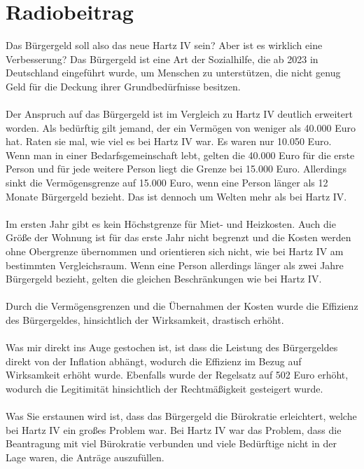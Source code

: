 \documentclass[11pt,a4paper]{article}
\begin{document}
    \section{Radiobeitrag}

    Das Bürgergeld soll also das neue Hartz IV sein?
    Aber ist es wirklich eine Verbesserung?
    Das Bürgergeld ist eine Art der Sozialhilfe, die ab 2023 in Deutschland eingeführt wurde, um Menschen zu unterstützen, die nicht genug Geld für die Deckung ihrer Grundbedürfnisse besitzen.
    \\\\
    Der Anspruch auf das Bürgergeld ist im Vergleich zu Hartz IV deutlich erweitert worden.
    Als bedürftig gilt jemand, der ein Vermögen von weniger als 40.000 Euro hat.
    Raten sie mal, wie viel es bei Hartz IV war.
    Es waren nur 10.050 Euro.
    Wenn man in einer Bedarfsgemeinschaft lebt, gelten die 40.000 Euro für die erste Person und für jede weitere Person liegt die Grenze bei 15.000 Euro.
    Allerdings sinkt die Vermögensgrenze auf 15.000 Euro, wenn eine Person länger als 12 Monate Bürgergeld bezieht.
    Das ist dennoch um Welten mehr als bei Hartz IV.
    \\\\
    Im ersten Jahr gibt es kein Höchstgrenze für Miet- und Heizkosten.
    Auch die Größe der Wohnung ist für das erste Jahr nicht begrenzt und die Kosten werden ohne Obergrenze übernommen und orientieren sich nicht, wie bei Hartz IV am bestimmten Vergleichsraum.
    Wenn eine Person allerdings länger als zwei Jahre Bürgergeld bezieht, gelten die gleichen Beschränkungen wie bei Hartz IV.
    \\\\
    Durch die Vermögensgrenzen und die Übernahmen der Kosten wurde die Effizienz des Bürgergeldes, hinsichtlich der Wirksamkeit, drastisch erhöht.
    \\\\
    Was mir direkt ins Auge gestochen ist, ist dass die Leistung des Bürgergeldes direkt von der Inflation abhängt, wodurch die Effizienz im Bezug auf Wirksamkeit erhöht wurde.
    Ebenfalls wurde der Regelsatz auf 502 Euro erhöht, wodurch die Legitimität hinsichtlich der Rechtmäßigkeit gesteigert wurde.
    \\\\
    Was Sie erstaunen wird ist, dass das Bürgergeld  die Bürokratie erleichtert, welche bei Hartz IV ein großes Problem war.
    Bei Hartz IV war das Problem, dass die Beantragung mit viel Bürokratie verbunden und viele Bedürftige nicht in der Lage waren, die Anträge auszufüllen.
\end{document}
